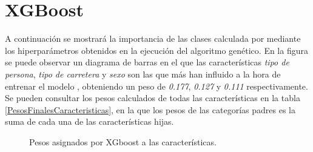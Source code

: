 \section{XGBoost}

  A continuación se mostrará la importancia de las clases calculada por  mediante los hiperparámetros obtenidos en la ejecución del algoritmo genético. En la figura \cite{FeatureWeightsImage} se puede observar un diagrama de barras en el que las características \textit{tipo de persona}, \textit{tipo de carretera} y \textit{sexo} son las que más han influido a la hora de entrenar el modelo , obteniendo un peso de \textit{0.177}, \textit{0.127} y \textit{0.111} respectivamente. Se pueden consultar los pesos calculados de todas las características en la tabla \ref{PesosFinalesCaracteristicas}, en la que los pesos de las categorías padres es la suma de cada una de las características hijas.

  \begin{figure}[H]
      \centering
      
      \caption{Pesos asignados por XGboost a las características.}
      \label{FeatureWeightsImage}
   \end{figure}


